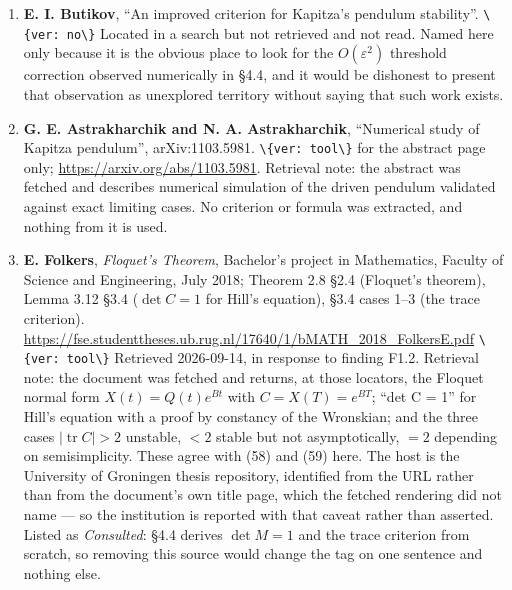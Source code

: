 \documentclass[11pt,a4paper]{article}
\providecommand{\passthrough}[1]{#1}
\begin{document}
\begin{enumerate}
  stripped or mangled --- it reported a stability condition ``\(a^2\omega^4>4gl\)'',
  which is dimensionally inconsistent for a pivot amplitude \(a\) --- so I have
  taken nothing quantitative from it and do not treat it as confirming any
  formula. The one thing that came through cleanly is the sentence attributing
  the effective potential for the slow motion to \textit{Mechanics} §30 of Landau's
  course.
\item
  \textbf{E. I. Butikov}, ``An improved criterion for Kapitza's pendulum stability''.
  \passthrough{\lstinline!\{ver: no\}!} Located in a search but not retrieved and not read. Named here
  only because it is the obvious place to look for the \(O(\varepsilon^2)\)
  threshold correction observed numerically in §4.4, and it would be dishonest
  to present that observation as unexplored territory without saying that such
  work exists.
\item
  \textbf{G. E. Astrakharchik and N. A. Astrakharchik}, ``Numerical study of Kapitza
  pendulum'', arXiv:1103.5981. \passthrough{\lstinline!\{ver: tool\}!} for the abstract page only;
  \url{https://arxiv.org/abs/1103.5981}. Retrieval note: the abstract was fetched
  and describes numerical simulation of the driven pendulum validated against
  exact limiting cases. No criterion or formula was extracted, and nothing from
  it is used.
\item
  \textbf{E. Folkers}, \textit{Floquet's Theorem}, Bachelor's project in Mathematics,
  Faculty of Science and Engineering, July 2018; Theorem 2.8 §2.4 (Floquet's
  theorem), Lemma 3.12 §3.4 (\(\det C=1\) for Hill's equation), §3.4 cases 1--3
  (the trace criterion).
  \url{https://fse.studenttheses.ub.rug.nl/17640/1/bMATH_2018_FolkersE.pdf}
  \passthrough{\lstinline!\{ver: tool\}!} Retrieved 2026-09-14, in response to finding F1.2. Retrieval
  note: the document was fetched and returns, at those locators, the Floquet
  normal form \(X(t)=Q(t)e^{Bt}\) with \(C=X(T)=e^{BT}\); ``det C = 1'' for Hill's
  equation with a proof by constancy of the Wronskian; and the three cases
  \(|\operatorname{tr}C|>2\) unstable, \(<2\) stable but not asymptotically, \(=2\)
  depending on semisimplicity. These agree with (58) and (59) here. The host is
  the University of Groningen thesis repository, identified from the URL rather
  than from the document's own title page, which the fetched rendering did not
  name --- so the institution is reported with that caveat rather than asserted.
  Listed as \textit{Consulted}: §4.4 derives \(\det M=1\) and the trace criterion from
  scratch, so removing this source would change the tag on one sentence and
  nothing else.
\end{enumerate}
\end{document}
